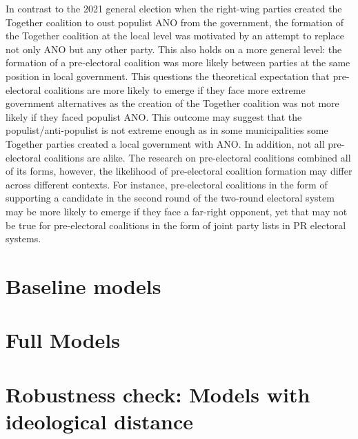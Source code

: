 \documentclass[]{interact}
\theoremstyle{plain}%
\theoremstyle{definition}
\theoremstyle{remark}
\begin{document}
In contrast to the 2021 general election when the right-wing parties created the Together coalition to oust populist ANO from the government, the formation of the Together coalition at the local level was motivated by an attempt to replace not only ANO but any other party. This also holds on a more general level: the formation of a pre-electoral coalition was more likely between parties at the same position in local government. This questions the theoretical expectation that pre-electoral coalitions are more likely to emerge if they face more extreme government alternatives as the creation of the Together coalition was not more likely if they faced populist ANO. This outcome may suggest that the populist/anti-populist is not extreme enough as in some municipalities some Together parties created a local government with ANO. In addition, not all pre-electoral coalitions are alike. The research on pre-electoral coalitions combined all of its forms, however, the likelihood of pre-electoral coalition formation may differ across different contexts. For instance, pre-electoral coalitions in the form of supporting a candidate in the second round of the two-round electoral system may be more likely to emerge if they face a far-right opponent, yet that may not be true for pre-electoral coalitions in the form of joint party lists in PR electoral systems. 




\newpage
\appendix

\section{Baseline models}
{}

\newpage

\section{Full Models}


\section{Robustness check: Models with ideological distance}
\label{app:1}

{}
\end{document}
